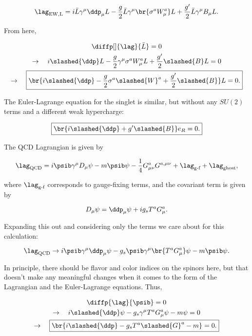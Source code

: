 \begin{equation}
  \lag_{\mathrm{EW,L}} = i\bar{L} \gamma^\mu \ddp_\mu L - \frac{g}{2} \bar{L}\gamma^\mu\br{\sigma^aW^a_\mu}L + \frac{g'}{2} \bar{L}\gamma^\mu B_\mu L.
\end{equation}

From here,

\begin{gather}
  \diffp[]{\lag}{\bar{L}} = 0 \\
  \rightarrow\quad i\slashed{\ddp}L - \frac{g}{2} \gamma^\mu \sigma^aW^a_\mu L + \frac{g'}{2} \slashed{B} L = 0 \\
  \rightarrow\quad \boxed{\br{i\slashed{\ddp} - \frac{g}{2} \sigma^a\slashed{W}^a + \frac{g'}{2}\slashed{B} }L = 0.}
\end{gather}

The Euler-Lagrange equation for the singlet is similar, but without any $SU(2)$ terms and a different weak hypercharge:

\begin{equation}
  \boxed{\br{i\slashed{\ddp} + g'\slashed{B}}e_R = 0.}
\end{equation}

The QCD Lagrangian is given by

\begin{equation}
  \lag_{\mathrm{QCD}} = i\psib \gamma^\mu D_\mu \psi - m\psib\psi - \frac{1}{4}G^a_{\mu\nu}G^{a,\mu\nu} + \lag_{\text{g-f}} + \lag_{\text{ghost}},
\end{equation}

where $\lag_{\text{g-f}}$ corresponds to gauge-fixing terms, and the covariant term is given by

\begin{equation}
  D_\mu \psi = \ddp_\mu \psi + ig_s T^a G^a_\mu.
\end{equation}

Expanding this out and considering only the terms we care about for this calculation:

\begin{equation}
  \lag_{\mathrm{QCD}} \rightarrow i\psib \gamma^\mu\ddp_\mu \psi - g_s\psib \gamma^\mu \br{T^aG^a_\mu}\psi - m\psib\psi.
\end{equation}

In principle, there should be flavor and color indices on the spinors here, but that doesn't make any meaningful changes when it comes to the form of the Lagrangian and the Euler-Lagrange equations. Thus,

\begin{gather}
  \diffp{\lag}{\psib} = 0 \\
  \rightarrow\quad i\slashed{\ddp}\psi - g_s\gamma^\mu T^aG^a_\mu \psi - m\psi = 0 \\
  \rightarrow\quad \boxed{\br{i\slashed{\ddp} - g_sT^a\slashed{G}^a - m} = 0.}
\end{gather}


